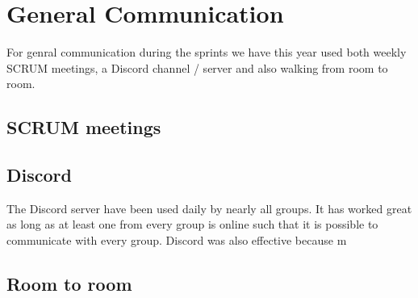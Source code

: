 \section{General Communication}
For genral communication during the sprints we have this year used both weekly
SCRUM meetings, a Discord channel / server and also walking from room to room.

\subsection{SCRUM meetings}

\subsection{Discord}
The Discord server have been used daily by nearly all groups. It has worked
great as long as at least one from every group is online such that it is
possible to communicate with every group. Discord was also effective because m

\subsection{Room to room}

